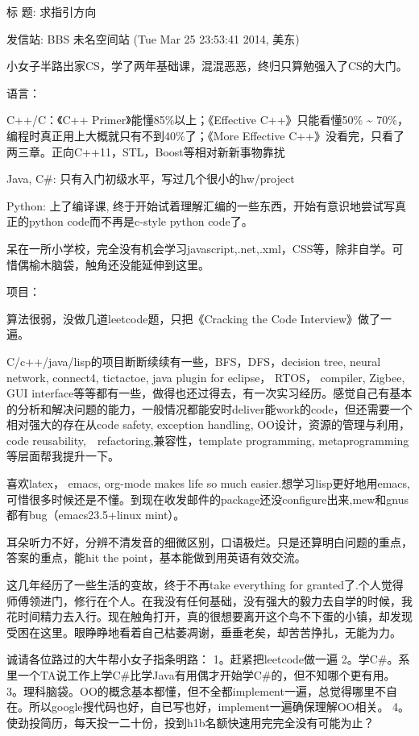 \documentclass[12pt]{book}
\begin{document}
标  题: 求指引方向

发信站: BBS 未名空间站 (Tue Mar 25 23:53:41 2014, 美东)

小女子半路出家CS，学了两年基础课，混混恶恶，终归只算勉强入了CS的大门。

语言：

C++/C：《C++ Primer》能懂85\%以上；《Effective C++》只能看懂50\% \textasciitilde{} 70\%，编程时真正用上大概就只有不到40\%了；《More Effective C++》没看完，只看了两三章。正向C++11，STL，Boost等相对新新事物靠扰

Java, C\#: 只有入门初级水平，写过几个很小的hw/project

Python: 上了编译课, 终于开始试着理解汇编的一些东西，开始有意识地尝试写真正的python code而不再是c-style python code了。

呆在一所小学校，完全没有机会学习javascript,.net,.xml，CSS等，除非自学。可惜偶榆木脑袋，触角还没能延伸到这里。        

项目：

算法很弱，没做几道leetcode题，只把《Cracking the Code Interview》做了一遍。

C/c++/java/lisp的项目断断续续有一些，BFS，DFS，decision tree, neural network, connect4, tictactoe, java plugin for eclipse， RTOS， compiler, Zigbee, GUI interface等等都有一些，做得也还过得去，有一次实习经历。感觉自己有基本的分析和解决问题的能力，一般情况都能安时deliver能work的code，但还需要一个相对强大的存在从code safety, exception handling, OO设计，资源的管理与利用，code reusability,　refactoring,兼容性，template programming, metaprogramming等层面帮我提升一下。

喜欢latex， emacs, org-mode makes life so much easier.想学习lisp更好地用emacs,可惜很多时候还是不懂。到现在收发邮件的package还没configure出来,mew和gnus都有bug（emacs23.5+linux mint）。

耳朵听力不好，分辨不清发音的细微区别，口语极烂。只是还算明白问题的重点，答案的重点，能hit the point，基本能做到用英语有效交流。

这几年经历了一些生活的变故，终于不再take everything for granted了.个人觉得师傅领进门，修行在个人。在我没有任何基础，没有强大的毅力去自学的时候，我花时间精力去入行。现在触角打开，真的很想要离开这个鸟不下蛋的小镇，却发现受困在这里。眼睁睁地看着自己枯萎凋谢，垂垂老矣，却苦苦挣扎，无能为力。

诚请各位路过的大牛帮小女子指条明路：
1。赶紧把leetcode做一遍
2。学C\#。系里一个TA说工作上学C\#比学Java有用偶才开始学C\#的，但不知哪个更有用。
3。理科脑袋。OO的概念基本都懂，但不全都implement一遍，总觉得哪里不自在。所以google搜代码也好，自已写也好，implement一遍确保理解OO相关。            
4。使劲投简历，每天投一二十份，投到h1b名额快速用完完全没有可能为止？
\end{document}

